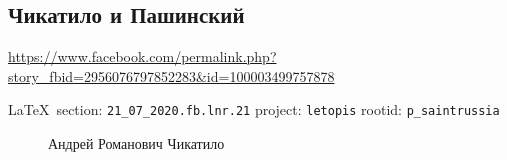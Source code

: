  
 

\subsection{Чикатило и Пашинский}
\url{https://www.facebook.com/permalink.php?story_fbid=2956076797852283&id=100003499757878}
  
\vspace{0.5cm}
{\small\LaTeX~section: \verb|21_07_2020.fb.lnr.21| project: \verb|letopis| rootid: \verb|p_saintrussia|}


\begin{figure}[ht]
 \centering
 \caption{Андрей Романович Чикатило}
 \label{fig:}
\end{figure}
\vspace{0.5cm}
  
